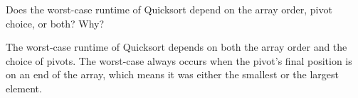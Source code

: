 \question Does the worst-case runtime of Quicksort depend on the array order, pivot choice, or both? Why?

\begin{solution}[1in]
The worst-case runtime of Quicksort depends on both the array order and the choice of pivots. The worst-case always occurs when the pivot's final position is on an end of the array, which means it was either the smallest or the largest element.
\end{solution}